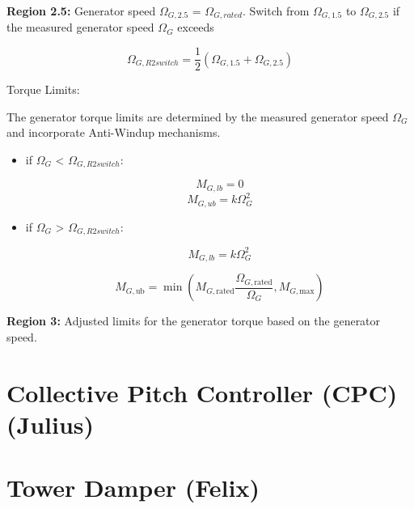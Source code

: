 \textbf{Region 2.5:} Generator speed $\Omega_{G,2.5}$ = $\Omega_{G,rated}$.
Switch from $\Omega_{G,1.5}$ to $\Omega_{G,2.5}$ if the measured generator speed $\Omega_{G}$ exceeds 

\begin{equation}
	\Omega_{G,R2switch} = \frac{1}{2} (\Omega_{G,1.5} + \Omega_{G,2.5})
	\label{equation:Omega_Region_2.5}
\end{equation}

Torque Limits: 

The generator torque limits are determined by the measured generator speed $\Omega_{G}$ and incorporate Anti-Windup mechanisms.

\begin{itemize}
	
	\item if $\Omega_{G}$ < $\Omega_{G,R2switch}$:
	
	\begin{equation}
		M_{G,lb} = 0
		\label{equation:MG,lb}
	\end{equation}
	\begin{equation}
		M_{G,ub} = k \Omega_{G}^2
		\label{equation:MG,ub}
	\end{equation}
	
	\item if $\Omega_{G}$ > $\Omega_{G,R2switch}$:
	
	\begin{equation}
		M_{G,lb} = k \Omega_{G}^2
		\label{equation:MG,lb,2}
	\end{equation}
	
	\begin{equation} 
		M_{G,\text{ub}} = \min\left(M_{G,\text{rated}}\frac{\Omega_{G,\text{rated}}}{\Omega_{G}}, M_{G,\text{max}}\right)
		\label{equation:MG,ub,2}
	\end{equation}
	
\end{itemize}

\textbf{Region 3:} Adjusted limits for the generator torque based on the generator speed.

\section{Collective Pitch Controller (CPC) (Julius)}


\section{Tower Damper (Felix)}

